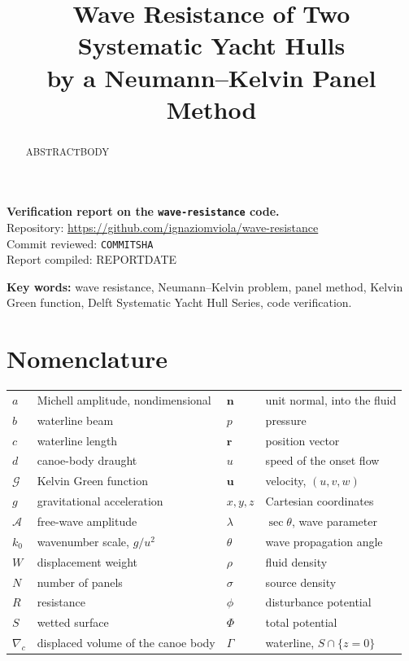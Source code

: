 \documentclass[11pt]{article}
\title{\vspace{-12mm}\bfseries Wave Resistance of Two Systematic Yacht Hulls\\
by a Neumann--Kelvin Panel Method}
\author{}
\date{}
\begin{document}
\maketitle
\vspace{-16mm}

\begin{center}
\begin{minipage}{0.9\textwidth}
\small
\textbf{Verification report on the \texttt{wave-resistance} code.}\\[2mm]
Repository: \url{https://github.com/ignaziomviola/wave-resistance}\\
Commit reviewed: \texttt{COMMITSHA}\\
Report compiled: REPORTDATE
\end{minipage}
\end{center}

\vspace{4mm}
\begin{abstract}
\noindent
ABSTRACTBODY
\end{abstract}

\noindent\textbf{Key words:} wave resistance, Neumann--Kelvin problem, panel method,
Kelvin Green function, Delft Systematic Yacht Hull Series, code verification.

\section*{Nomenclature}
\noindent
\begin{tabular}{@{}ll@{\hspace{10mm}}ll@{}}
$a$      & Michell amplitude, nondimensional      & $\bm{n}$ & unit normal, into the fluid\\
$b$      & waterline beam                          & $p$      & pressure\\
$c$      & waterline length                        & $\bm{r}$ & position vector\\
$d$      & canoe-body draught                      & $u$      & speed of the onset flow\\
$\mathcal{G}$ & Kelvin Green function              & $\bm{u}$ & velocity, $(u,v,w)$\\
$g$      & gravitational acceleration              & $x,y,z$  & Cartesian coordinates\\
$\mathcal{A}$ & free-wave amplitude                & $\lambda$ & $\sec\theta$, wave parameter\\
$k_0$    & wavenumber scale, $g/u^2$               & $\theta$ & wave propagation angle\\
$W$      & displacement weight                     & $\rho$   & fluid density\\
$N$      & number of panels                        & $\sigma$ & source density\\
$R$      & resistance                              & $\phi$   & disturbance potential\\
$S$      & wetted surface                          & $\Phi$   & total potential\\
$\nabla_c$ & displaced volume of the canoe body    & $\Gamma$ & waterline, $S\cap\{z=0\}$\\
\end{tabular}
\end{document}
